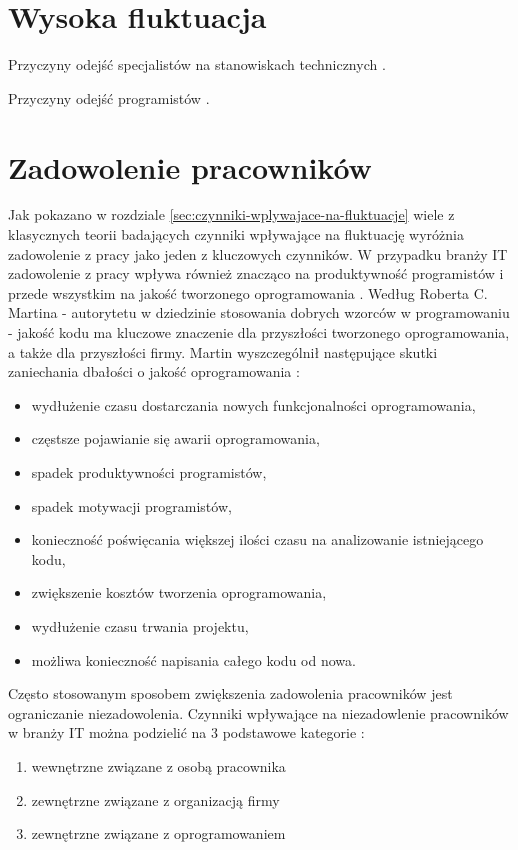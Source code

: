 \section{Wysoka fluktuacja}\label{sec:it-turnover}

Przyczyny odejść specjalistów na stanowiskach technicznych \cite{kapor-2017}.

Przyczyny odejść programistów \cite{hannon-2008}.


\section{Zadowolenie pracowników}\label{sec:it-motivation}
Jak pokazano w rozdziale \ref{sec:czynniki-wplywajace-na-fluktuacje} wiele z klasycznych teorii badających czynniki wpływające na fluktuację wyróżnia zadowolenie z pracy jako jeden z kluczowych czynników.
W przypadku branży IT zadowolenie z pracy wpływa również znacząco na produktywność programistów i przede wszystkim na jakość tworzonego oprogramowania \cite{graziotin-2018}.
Według Roberta C. Martina - autorytetu w dziedzinie stosowania dobrych wzorców w programowaniu - jakość kodu ma kluczowe znaczenie dla przyszłości tworzonego oprogramowania, a także dla przyszłości firmy.
Martin wyszczególnił następujące skutki zaniechania dbałości o jakość oprogramowania \cite{martin-2014}:
\begin{itemize}
    \item wydłużenie czasu dostarczania nowych funkcjonalności oprogramowania,
    \item częstsze pojawianie się awarii oprogramowania,
    \item spadek produktywności programistów,
    \item spadek motywacji programistów,
    \item konieczność poświęcania większej ilości czasu na analizowanie istniejącego kodu,
    \item zwiększenie kosztów tworzenia oprogramowania,
    \item wydłużenie czasu trwania projektu,
    \item możliwa konieczność napisania całego kodu od nowa.
\end{itemize}

Często stosowanym sposobem zwiększenia zadowolenia pracowników jest ograniczanie niezadowolenia.
Czynniki wpływające na niezadowlenie pracowników w branży IT można podzielić na 3 podstawowe kategorie \cite{graziotin-2017}:
\begin{enumerate}
    \item wewnętrzne związane z osobą pracownika
    \item zewnętrzne związane z organizacją firmy
    \item zewnętrzne związane z oprogramowaniem
    \end{enumerate}

